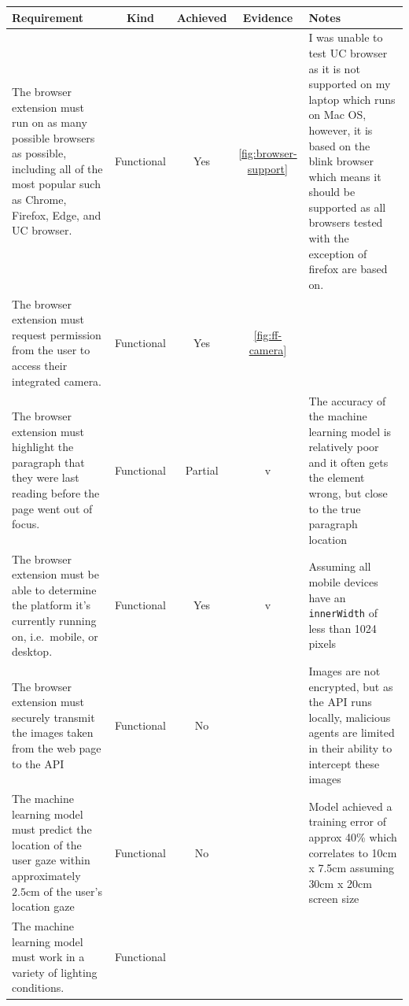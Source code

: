 \documentclass{report}
\begin{document}
\begin{center}
\begin{tabularx}{\textwidth}{|X|c|c|c|X|}
    \caption{Analysis of Requirements Compliance Table} \\ 
    \hline
    \textbf{Requirement} & \textbf{Kind} & \textbf{Achieved} & \textbf{Evidence} & \textbf{Notes} \\ 
    \hline
    \endfirsthead    
    \hline
    \endhead
    \hline
    \endfoot 
    \hline
    \endlastfoot 
    \hline

    The browser extension must run on as many possible browsers as possible, including all of the most popular such as Chrome, Firefox, Edge, and UC browser. & Functional & Yes & \autoref{fig:browser-support} & I was unable to test UC browser as it is not supported on my laptop which runs on Mac OS, however, it is based on the blink browser which means it should be supported as all browsers tested with the exception of firefox are based on.  \\
    \hline
    The browser extension must request permission from the user to access their integrated camera. & Functional & Yes & \autoref{fig:ff-camera} & \\
    \hline
    The browser extension must highlight the paragraph that they were last reading before the page went out of focus.  & Functional & Partial & v & The accuracy of the machine learning model is relatively poor and it often gets the element wrong, but close to the true paragraph location \\
    \hline
    The browser extension must be able to determine the platform it's currently running on, i.e.~mobile, or desktop. & Functional & Yes & v & Assuming all mobile devices have an \texttt{innerWidth} of less than 1024 pixels \\
    \hline
    The browser extension must securely transmit the images taken from the web page to the API & Functional & No & ~ & Images are not encrypted, but as the API runs locally, malicious agents are limited in their ability to intercept these images \\
    \hline
    The machine learning model must predict the location of the user gaze within approximately \(2.5\text{cm}\) of the user's location gaze  & Functional & No & ~ & Model achieved a training error of approx 40\% which correlates to 10cm x 7.5cm assuming 30cm x 20cm screen size \\
    \hline
    The machine learning model must work in a variety of lighting conditions. & Functional & ~ & ~ & \\

\end{tabularx}
\end{center}
\end{document}
